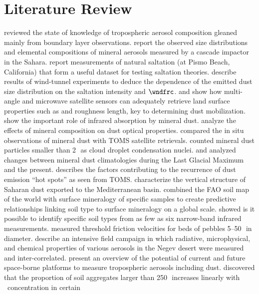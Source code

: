 \documentclass[12pt,twoside]{book}
\begin{document}
\section[Literature Review]{Literature Review}\label{sxn:ltr_rvw_mdl}
\cite{Hei89} reviewed the state of knowledge of tropospheric aerosol
composition gleaned mainly from boundary layer observations.
\cite{GBC90} report the observed size distributions and elemental
compositions of mineral aerosols measured by a cascade impactor in the
Sahara. 
\cite{GBW96} report measurements of natural saltation (at Pismo Beach,
California) that form a useful dataset for testing saltation theories.
\cite{AGG97} describe results of wind-tunnel experiments to deduce the
dependence of the emitted dust size distribution on the saltation
intensity and $\wndfrc$.
\cite{PRM99} and \cite{LRG99} show how multi-angle and microwave
satellite sensors can adequately retrieve land surface properties such
as  and roughness length, key to determining dust
mobilization.  
\cite{STB98} show the important role of infrared absorption by mineral dust.
\cite{SoT99} analyze the effects of mineral composition on dust
optical properties.
\cite{CPH99} compared the in situ observations of mineral dust with
TOMS satellite retrievals.
\cite{LFC99} counted mineral dust particles smaller than 2\,\um\ as
cloud droplet condensation nuclei.
\cite{RFM991} and \cite{RFM992} analyzed changes between mineral dust
climatologies during the Last Glacial Maximum and the present.
\cite{Gil99} describes the factors contributing to the recurrence of 
dust emission ``hot spots'' as seen from TOMS.
\cite{HCB99} characterize the vertical structure of Saharan dust
exported to the Mediterranean basin.
\cite{CSB99} combined the FAO soil map of the world with surface
mineralogy of specific samples to create predictive relationships
linking soil type to surface mineralogy on a global scale.
\cite{LBS99} showed is it possible to identify specific soil types
from as few as six narrow-band infrared measurements.
\cite{BaP99} measured threshold friction velocities for beds of
pebbles 5--50\,\mm\ in diameter.
\cite{IAA99} describe an intensive field campaign in which radiative, 
microphysical, and chemical properties of various aerosols in the
Negev desert were measured and inter-correlated.
\cite{KKT99} present an overview of the potential of current and
future space-borne platforms to measure tropospheric aerosols
including dust.
\cite{RWA99} discovered that the proportion of soil aggregates larger
than 250\,\um\ increases linearly with \COd\ concentration in certain
\end{document}
